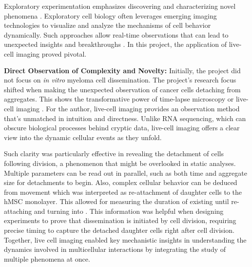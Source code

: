 




% 
%
\label{sec:discussion_potential_breakthroughs}%
Exploratory experimentation emphasizes discovering and characterizing novel
phenomena \cite{mattigClassifyingExploratoryExperimentation2022}. Exploratory
cell biology often leverages emerging imaging technologies to visualize and
analyze the mechanisms of cell behavior dynamically. Such approaches allow
real-time observations that can lead to unexpected insights and breakthroughs
\cite{coleLivecellImaging2014}. In this project, the application of live-cell
imaging proved pivotal.

\textbf{Direct Observation of Complexity and Novelty:}
Initially, the project did not focus on \textit{in vitro} myeloma cell
dissemination. The project's research focus shifted when making the unexpected
 observation of cancer cells
detaching from aggregates. This shows the transformative power of time-lapse
microscopy or live-cell imaging \cite{coleLivecellImaging2014}. For the author,
live-cell imaging provides an observation method that's unmatched in intuition
and directness. Unlike RNA sequencing, which can obscure biological processes
behind cryptic data, live-cell imaging offers a clear view into the dynamic
cellular events as they unfold.

Such clarity was particularly effective in revealing the detachment of cells
following division, a phenomenon that might be overlooked in static analyses.
Multiple parameters can be read out in parallel, such as both time and aggregate
size for detachments to begin. Also, complex cellular behavior can be deduced
from movement  which was interpreted as
re-attachment of \INA daughter cells to the \ac{hMSC} monolayer. This allowed
for measuring the duration of \nMAina existing until re-attaching and turning
into \MAina. This information was helpful when designing experiments to prove
that dissemination is initiated by cell division, requiring precise timing to
capture the detached daughter cells right after cell division. Together, live
cell imaging enabled key mechanistic insights in understanding the dynamics
involved in multicellular interactions by integrating the study of multiple
phenomena at once.

